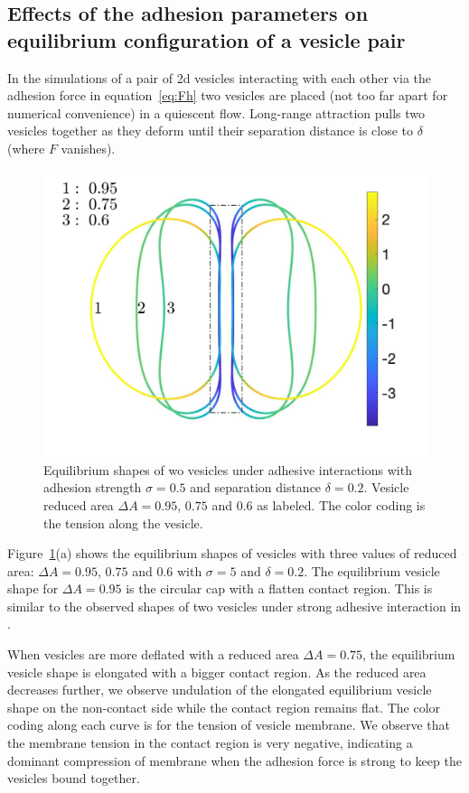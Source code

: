 \documentclass[%
preprint,
 amsmath,amssymb,
 aps,
]{revtex4-1}
\begin{document}
\subsection{Effects of the adhesion parameters on equilibrium configuration of a vesicle pair}
\label{subsec:qflow_adhesion_parameters} 
In the simulations of a pair of 2d vesicles interacting with each other via the adhesion force in equation~\ref{eq:Fh} 
two vesicles are placed (not too far apart for numerical convenience) in a quiescent flow. Long-range attraction pulls two vesicles together as they deform until their
separation distance is close to $\delta$ (where $F$ vanishes). 
\begin{figure}
\includegraphics[keepaspectratio=true,scale=0.25]{figs/Dec18_vesicle_shape_vs_rA_00.jpeg}
\caption{Equilibrium shapes of wo vesicles under adhesive  interactions with adhesion strength $\sigma=0.5$ and separation distance $\delta=0.2$. 
Vesicle reduced area $\Delta A=0.95$, $0.75$ and $0.6$ as labeled.
 The color coding is the tension along the vesicle.}
\label{fig:Dec18_vesicle_shape}
\end{figure}

Figure~\ref{fig:Dec18_vesicle_shape}(a) shows the equilibrium shapes of vesicles with
three values of reduced area: $\Delta A=0.95$, $0.75$ and $0.6$ with $\sigma=5$ and $\delta = 0.2$.
The equilibrium vesicle shape for $\Delta A=0.95$ is the circular cap with a flatten contact region. 
This is similar to the observed shapes of two vesicles under strong adhesive interaction in \cite{RamachandranAndersonLealIsraelachvili2010_Langmuir}.

When vesicles are more deflated with a reduced area  $\Delta A = 0.75$, the equilibrium vesicle shape is elongated with a bigger contact region.
As the reduced area decreases further, we observe undulation of the elongated equilibrium vesicle shape on the non-contact side while the contact region remains flat. 
The color coding along each curve is for the tension of vesicle membrane.
We observe that the membrane tension in the contact region is very negative, indicating a dominant compression of membrane when the adhesion force is strong to keep the vesicles bound together.
\end{document}
